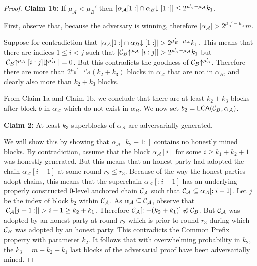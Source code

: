 \begin{proof}
    \textbf{Claim 1b: } If $\mu_\mathcal{A} < \mu_B'$ then
    $|\alpha_\mathcal{A}[1:] \cap \alpha_B\negthickspace\downarrow[1:]| \leq 2^{\mu_B' - \mu_\mathcal{A}} k_1$.

    First, observe that, because the adversary is winning, therefore
    $|\alpha_\mathcal{A}| > 2^{\mu_B' - \mu_\mathcal{A}}m$.

    Suppose for contradiction that $|\alpha_\mathcal{A}[1:] \cap
    \alpha_B\negthickspace\downarrow[1:]| > 2^{\mu_B' - \mu_\mathcal{A}} k_1$. This means that
    there are indices $1 \leq i < j$ such that
    $|\mathcal{C}_B\negthickspace\uparrow^{\mu_\mathcal{A}}[i:j]| > 2^{\mu_B' - \mu_\mathcal{A}}
    k_1$ but
    $|\mathcal{C}_B\negthickspace\uparrow^{\mu_\mathcal{A}}[i:j]\negthickspace\downarrow\negthickspace\uparrow^{\mu_B'}| = 0$.
    But this contradicts the goodness of $\mathcal{C}_B\negthickspace\uparrow^{\mu_B'}$. Therefore
    there are more than $2^{\mu_B' - \mu_\mathcal{A}}(k_2 + k_3)$ blocks in
    $\alpha_\mathcal{A}$ that are not in $\alpha_B$, and clearly also more than $k_2 + k_3$ blocks.

    From Claim 1a and Claim 1b, we conclude that there are at least $k_2 + k_3$
    blocks after block $b$ in $\alpha_\mathcal{A}$ which do not exist in
    $\alpha_B$. We now set $b_2 = \textsf{LCA}(\mathcal{C}_B, \alpha_\mathcal{A})$.

    \textbf{Claim 2: } At least $k_3$ superblocks of $\alpha_\mathcal{A}$ are
    adversarially generated.

    We will show this by showing that $\alpha_\mathcal{A}[k_2 + 1:]$ contains
    no honestly mined blocks. By contradiction, assume that the block
    $\alpha_\mathcal{A}[i]$ for some $i \geq k_1 + k_2 + 1$ was honestly generated.
    But this means that an honest party had adopted the chain
    $\alpha_\mathcal{A}[i - 1]$ at some round $r_2 \leq r_3$. Because of the
    way the honest parties adopt chains, this means that the superchain
    $\alpha_\mathcal{A}[:i - 1]$ has an underlying properly constructed
    $0$-level anchored chain $\mathcal{C}_\mathcal{A}$ such that
    $\mathcal{C}_\mathcal{A} \subseteq \alpha_\mathcal{A}[:i - 1]$. Let $j$ be
    the index of block $b_2$ within $\mathcal{C}_\mathcal{A}$.  As
    $\alpha_\mathcal{A} \subseteq \mathcal{C}_\mathcal{A}$, observe that
    $|\mathcal{C}_\mathcal{A}[j + 1:]| > i -
    1 \geq k_2 + k_1$.  Therefore $\mathcal{C}_\mathcal{A}[:-(k_2 + k_1)] \not\preccurlyeq
    \mathcal{C}_B$.  But $\mathcal{C}_\mathcal{A}$ was adopted by an honest party at
    round $r_2$ which is prior to round $r_3$ during which $\mathcal{C}_B$ was
    adopted by an honest party. This contradicts the Common Prefix
    \cite{backbone} property with parameter $k_2$.
    It follows that with overwhelming probability in $k_2$, the $k_3 = m - k_2 -
    k_1$ last blocks of the adversarial proof have been adversarially mined.


\end{proof}
